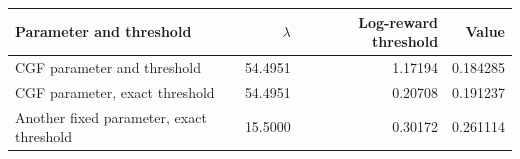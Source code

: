 \begin{tabular}{lrrr}
\hline
Parameter and threshold & $\lambda$ & Log-reward threshold & Value \\
\hline
CGF parameter and threshold & 54.4951 & 1.17194 & 0.184285 \\
CGF parameter, exact threshold & 54.4951 & 0.20708 & 0.191237 \\
Another fixed parameter, exact threshold & 15.5000 & 0.30172 & 0.261114 \\
\hline
\end{tabular}
